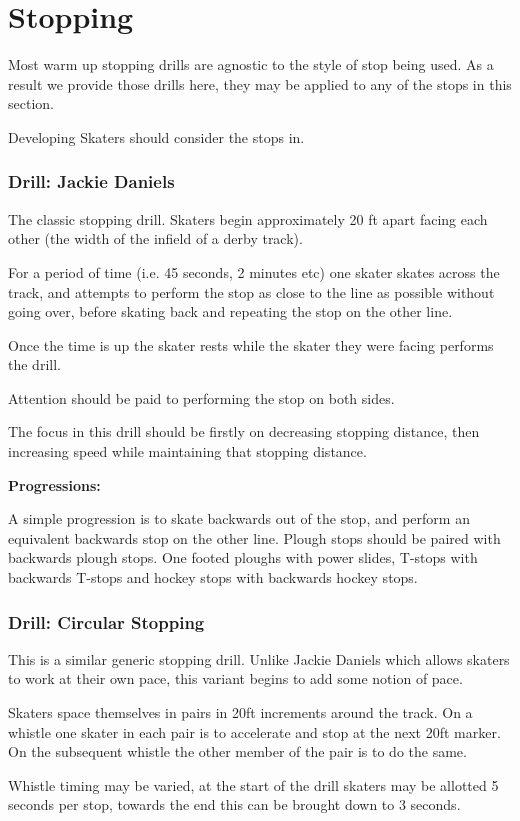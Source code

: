 \chapter{Stopping}
\label{ch:stopping}


Most warm up stopping drills are agnostic to the style of stop being used. 
As a result we provide those drills here, they may be applied to any of the stops in this section.  


Developing Skaters should consider the stops in. 
 

\subsection*{Drill: Jackie Daniels} 
\label{drill:stopping/jackie_daniels}


The classic stopping drill.
Skaters begin approximately 20 ft apart facing each other (the width of the infield of a derby track).

For a period of time (i.e. 45 seconds, 2 minutes etc) one skater skates across the track, and attempts to perform the stop as close to the line as possible without going over, before skating back and repeating the stop on the other line.   

Once the time is up the skater rests while the skater they were facing performs the drill. 

Attention should be paid to performing the stop on both sides.  


The focus in this drill should be firstly on decreasing stopping distance, then increasing speed while maintaining that stopping distance.

{\bf Progressions:}

A simple progression is to skate backwards out of the stop, and perform an equivalent backwards stop on the other line.
Plough stops should be paired with backwards plough stops. One footed ploughs with power slides, T-stops with backwards T-stops and hockey stops with backwards hockey stops.


\subsection*{Drill: Circular Stopping}
\label{drill:stopping/circular}

This is a similar generic stopping drill.  
Unlike Jackie Daniels which allows skaters to work at their own pace, this variant begins to add some notion of pace.


Skaters space themselves in pairs in 20ft increments around the track. 
On a whistle one skater in each pair is to accelerate and stop at the next 20ft marker. 
On the subsequent whistle the other member of the pair is to do the same. 

Whistle timing may be varied, at the start of the drill skaters may be allotted 5 seconds per stop, towards the end this can be brought down to 3 seconds. 



